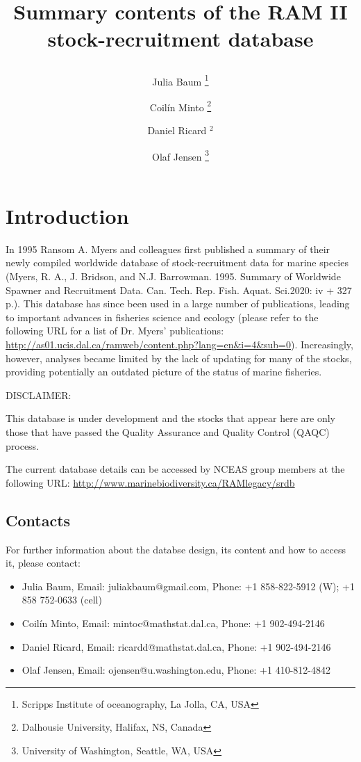 \documentclass[a4paper,10pt,oneside]{book}
\author{Julia Baum \thanks{Scripps Institute of oceanography, La Jolla, CA, USA} \and Coil\'{i}n Minto \thanks{Dalhousie University, Halifax, NS, Canada} \and Daniel Ricard $^{2}$ \and Olaf Jensen \thanks{University of Washington, Seattle, WA, USA}}
\title{\begin{LARGE}Summary contents of the RAM II stock-recruitment database\end{LARGE}} %
\begin{document}
\maketitle
\tableofcontents

\chapter{Introduction}

In 1995 Ransom A. Myers and colleagues first published a summary of their newly compiled worldwide database of stock-recruitment data for marine species (Myers, R. A., J. Bridson, and N.J. Barrowman. 1995. Summary of Worldwide Spawner and Recruitment Data. Can. Tech. Rep. Fish. Aquat. Sci.2020: iv + 327 p.). This database has since been used in a large number of publications, leading to important advances in fisheries science and ecology (please refer to the following URL for a list of Dr. Myers' publications: \url{http://as01.ucis.dal.ca/ramweb/content.php?lang=en&i=4&sub=0}). Increasingly, however, analyses became limited by the lack of updating for many of the stocks, providing potentially an outdated picture of the status of marine fisheries. 



\vspace{0.3cm}
\begin{Large}DISCLAIMER: \end{Large} This database is under development and the stocks that appear here are only those that have passed the Quality Assurance and Quality Control (QAQC) process.
%

The current database details can be accessed by NCEAS group members at the following URL:
\url{http://www.marinebiodiversity.ca/RAMlegacy/srdb}

\newpage



\section{Contacts}

For further information about the databse design, its content and how to access it, please contact:
\begin{itemize}
 \item Julia Baum, Email: juliakbaum@gmail.com, Phone: +1 858-822-5912 (W); +1 858 752-0633 (cell)
 \item Coil\'{i}n Minto, Email: mintoc@mathstat.dal.ca, Phone: +1 902-494-2146
 \item Daniel Ricard, Email: ricardd@mathstat.dal.ca, Phone: +1 902-494-2146
 \item Olaf Jensen, Email: ojensen@u.washington.edu, Phone: +1 410-812-4842

\end{itemize}
\end{document}
